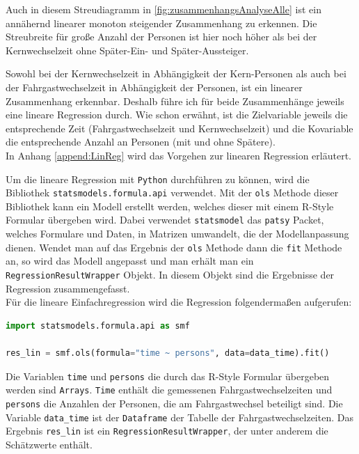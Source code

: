 Auch in diesem Streudiagramm in \figurename \ref{fig:zusammenhangsAnalyseAlle} ist ein annähernd linearer monoton steigender Zusammenhang zu erkennen. Die Streubreite für große Anzahl der Personen ist hier noch höher als bei der Kernwechselzeit ohne Später-Ein- und Später-Aussteiger. 

Sowohl bei der Kernwechselzeit in Abhängigkeit der Kern-Personen als auch bei der Fahrgastwechselzeit in Abhängigkeit der Personen, ist ein linearer Zusammenhang erkennbar. Deshalb führe ich für beide Zusammenhänge jeweils eine lineare Regression durch. Wie schon erwähnt, ist die Zielvariable jeweils die entsprechende Zeit (Fahrgastwechselzeit und Kernwechselzeit) und die Kovariable die entsprechende Anzahl an Personen (mit und ohne Spätere). \\
In Anhang \ref{append:LinReg} wird das Vorgehen zur linearen Regression erläutert.

Um die lineare Regression mit \texttt{Python} durchführen zu können, wird die Bibliothek \texttt{statsmodels.formula.api} verwendet. Mit der \texttt{ols} Methode dieser Bibliothek kann ein Modell erstellt werden, welches dieser mit einem R-Style Formular übergeben wird. Dabei verwendet \texttt{statsmodel} das \texttt{patsy} Packet, welches Formulare und Daten, in Matrizen umwandelt, die der Modellanpassung dienen. Wendet man auf das Ergebnis der \texttt{ols} Methode dann die \texttt{fit} Methode an, so wird das Modell angepasst und  man erhält man ein \texttt{RegressionResultWrapper} Objekt. In diesem Objekt sind die Ergebnisse der Regression zusammengefasst. \\
Für die lineare Einfachregression wird die Regression folgendermaßen aufgerufen:
\begin{lstlisting}[language=Python]
import statsmodels.formula.api as smf

res_lin = smf.ols(formula="time ~ persons", data=data_time).fit()
\end{lstlisting}
Die Variablen \texttt{time} und \texttt{persons} die durch das R-Style Formular übergeben werden sind \texttt{Arrays}. \texttt{Time} enthält die gemessenen Fahrgastwechselzeiten und \texttt{persons} die Anzahlen der Personen, die am Fahrgastwechsel beteiligt sind. Die Variable \texttt{data\_time} ist der \texttt{Dataframe} der Tabelle der Fahrgastwechselzeiten. Das Ergebnis \texttt{res\_lin} ist ein \texttt{RegressionResultWrapper}, der unter anderem die Schätzwerte enthält.


